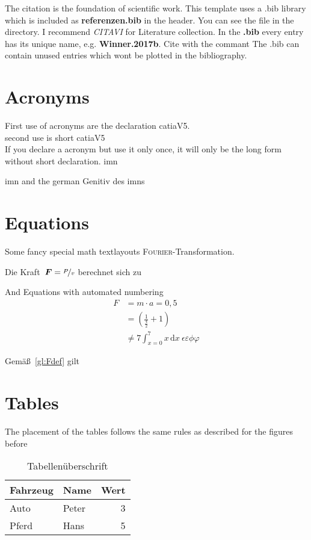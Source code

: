 \documentclass[12pt,
titlepage,
a4paper,
oneside,     %
openany,     %
listof=totoc,  %
numbers = noenddot, %
bibliography=totoc,    %
headsepline, %
]{scrbook} %
\newcommand{\ve}[1]{\ensuremath \boldsymbol{#1}\xspace}
\newcommand{\scFt}{\textsc{Fourier}-Transformation\xspace}
\begin{document}
The citation is the foundation of scientific work. This template uses a .bib library which is included as \textbf{referenzen.bib} in the header. You can see the file in the directory. I recommend \textit{CITAVI} for Literature collection.
In the \textbf{.bib} every entry has its unique name, e.g. \textbf{Winner.2017b}. Cite with the commant \cite{Winner.2017b}
The .bib can contain unused entries which wont be plotted in the bibliography.

\section{Acronyms}
\label{sec_acronyms}

First use of acronyms are the declaration \ac{catiaV5}.  \\
second use is short \ac{catiaV5} \\
If you declare a acronym but use it only once, it will only be the long form without short declaration. \ac{imn} 

\ac{imn} and the german Genitiv des \acp{imn}

\section{Equations}
\label{sec_Equations}

Some fancy special math textlayouts \scFt.

Die Kraft~$\ve{F} = \nicefrac{P}{v}$ berechnet sich zu

And Equations with automated numbering
\begin{align}
	F &= m \cdot a = 0,5 \nonumber\\
	&= \left( \frac{1}{\frac{4}{2}} + 1 \right)	\label{gl:Fdef}\\
	&\neq 7 \int_{x=0}^{7} x \, \mathrm{d}x ~ \epsilon \varepsilon \phi \varphi
\end{align}

Gemäß~\ref{gl:Fdef} gilt

\section{Tables}
\label{sec:tables}

The placement of the tables follows the same rules as described for the figures before

\begin{table}[h]
	\caption{Tabellenüberschrift}
	\label{tab_ExampleTable}
	\centering
	\begin{tabular}{l l r}
		Fahrzeug & Name & Wert \\
		\toprule
		Auto & Peter & 3  \\ 
		Pferd & Hans & 5  \\
	\end{tabular}
\end{table}
\end{document}
